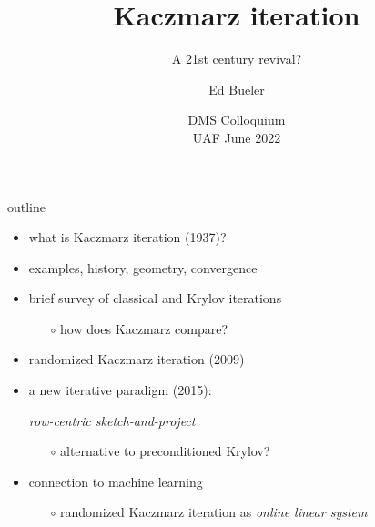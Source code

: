 \documentclass[usepdftitle=false,usenames,dvipsnames]{beamer}
\title{Kaczmarz iteration}
\subtitle{A 21st century revival?}
\author{Ed Bueler}
\date{DMS Colloquium \\ UAF June 2022}
\begin{document}
\begin{frame}
	\maketitle
\end{frame}


\begin{frame}{outline}

\begin{itemize}
\item what is Kaczmarz iteration (1937)?
\item examples, history, geometry, convergence
\item brief survey of classical and Krylov iterations
    \begin{itemize}
    \item[$\circ$] how does Kaczmarz compare?
    \end{itemize}
\item randomized Kaczmarz iteration (2009)
\item a new iterative paradigm (2015):

\begin{center}
\emph{row-centric sketch-and-project}
\end{center}

    \begin{itemize}
    \item[$\circ$] alternative to preconditioned Krylov?
    \end{itemize}
\item connection to machine learning
    \begin{itemize}
    \item[$\circ$] randomized Kaczmarz iteration as \emph{online linear system}
    \end{itemize}
\end{itemize}
\end{frame}
\end{document}
